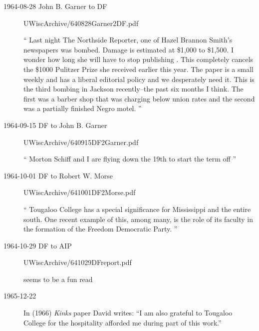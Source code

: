 \begin{description}
\item[1964-08-28 John B. Garner to DF] UWiscArchive/640828Garner2DF.pdf

``
Last night The Northside Reporter, one of Hazel Brannon Smith's newspapers
was bombed. Damage is estimated at \$1,000 to \$1,500. I wonder how long she
will have to stop publishing . This completely cancels the \$1000 Pulitzer
Prize she received earlier this year. The paper is a small weekly and has a
liberal editorial policy and we desperately need it. This is the third
bombing in Jackson recently--the past six months I think. The first was a
barber shop that was charging below union rates and the second was a
partially finished Negro motel.
''

\item[1964-09-15  DF to John B. Garner] UWiscArchive/640915DF2Garner.pdf

``
Morton Schiff and I are flying down the 19th to start the term off
''

\item[1964-10-01  DF to Robert W. Morse] UWiscArchive/641001DF2Morse.pdf

``
Tougaloo College has a special significance for Mississippi and the entire
south. One recent example of this, among many, is the role of its faculty in
the formation of the Freedom Democratic Party.
''


\item[1964-10-29  DF to AIP] UWiscArchive/641029DFreport.pdf

seems to be a fun read

\item[1965-12-22]
In (1966) {\em Kinks} paper David writes: ``I am also grateful
to Tougaloo College for the hospitality afforded me during part of this
work.''

\end{description}
